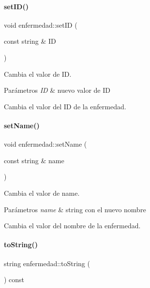 \paragraph{\texorpdfstring{set\+I\+D()}{setID()}}
{\footnotesize\ttfamily void enfermedad\+::set\+ID (\begin{DoxyParamCaption}\item[{const string \&}]{ID }\end{DoxyParamCaption})}



Cambia el valor de ID. 


\begin{DoxyParams}{Parámetros}
{\em ID} & nuevo valor de ID\\
\hline
\end{DoxyParams}
Cambia el valor del ID de la enfermedad. \hypertarget{classenfermedad_a18f621d13de01c0b06a05757ddd8a087}{}\label{classenfermedad_a18f621d13de01c0b06a05757ddd8a087} 
\paragraph{\texorpdfstring{set\+Name()}{setName()}}
{\footnotesize\ttfamily void enfermedad\+::set\+Name (\begin{DoxyParamCaption}\item[{const string \&}]{name }\end{DoxyParamCaption})}



Cambia el valor de name. 


\begin{DoxyParams}{Parámetros}
{\em name} & string con el nuevo nombre\\
\hline
\end{DoxyParams}
Cambia el valor del nombre de la enfermedad. \hypertarget{classenfermedad_a79487a17f935b7d0e7b90e1a9a8f983c}{}\label{classenfermedad_a79487a17f935b7d0e7b90e1a9a8f983c} 
\paragraph{\texorpdfstring{to\+String()}{toString()}}
{\footnotesize\ttfamily string enfermedad\+::to\+String (\begin{DoxyParamCaption}{ }\end{DoxyParamCaption}) const}




